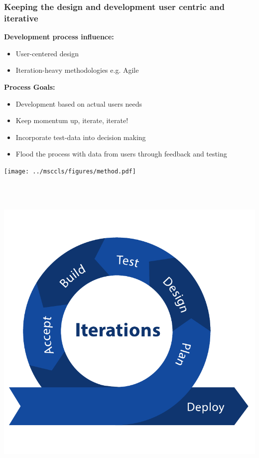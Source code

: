 \documentclass[xcolor=svgnames,10pt,aspectratio=1610]{beamer}
\begin{document}
\begin{frame}
  \frametitle{Keeping the design and development user centric and iterative}
  \begin{minipage}{.49\textwidth}
    \textbf{Development process influence:}
    \begin{itemize}
      \item{User-centered design}
      \item{Iteration-heavy methodologies e.g. Agile}
    \end{itemize}
    \textbf{Process Goals:}
    \begin{itemize}
      \item{Development based on actual users needs}
      \item{Keep momentum up, iterate, iterate!}
      \item{Incorporate test-data into decision making}
      \item{Flood the process with data from users through feedback and testing}
    \end{itemize}
  \end{minipage}
  \begin{minipage}{.49\textwidth}
    \begin{minipage}{\textwidth}
      \centering
      \texttt{[image: ../msccls/figures/method.pdf]}
    \end{minipage} \\
    \vspace{0.3cm} \\
    \begin{minipage}{\textwidth}
      \begin{minipage}{0.49\textwidth}
        \centering
        \includegraphics[width=1.1\textwidth]{img/iteration.pdf}

\end{minipage}
\end{minipage}
\end{minipage}
\end{frame}
\end{document}
